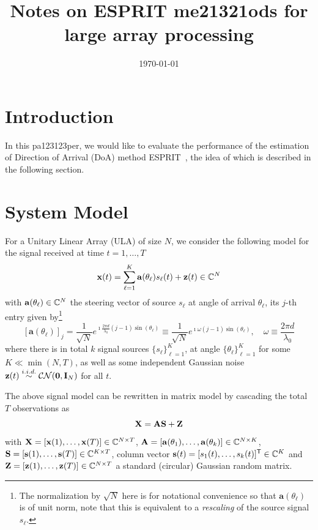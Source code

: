 \documentclass[11pt,a4paper]{article}
\title{Notes on ESPRIT me21321ods for large array processing}
\author{}
\date{\today}
\begin{document}
\maketitle

\section{Introduction}

In this pa123123per, we would like to evaluate the performance of the estimation of Direction of Arrival (DoA) method ESPRIT~\cite{paulraj1986subspace}, the idea of which is described in the following section.

\section{System Model}

For a Unitary Linear Array (ULA) of size $N$, we consider the following model for the signal received at time $t= 1,\ldots, T$
\begin{equation}
	\mathbf{x}(t) = \sum_{\ell = 1}^K \mathbf{a}(\theta_\ell) s_\ell(t) + \mathbf{z}(t) \in {\mathbb{C}}^N
\end{equation}
with $\mathbf{a}(\theta_\ell) \in {\mathbb{C}}^N$ the steering vector of source $s_\ell$ at angle of arrival $\theta_\ell$, its $j$-th entry given by\footnote{The normalization by $\sqrt N$ here is for notational convenience so that $\mathbf{a}(\theta_\ell)$ is of unit norm, note that this is equivalent to a \emph{rescaling} of the source signal $s_\ell$.}
\begin{equation}\label{eq:def_ULA}
	[\mathbf{a}(\theta_\ell)]_j = \frac1{\sqrt N} e^{\imath \frac{2\pi d}{\lambda_0} (j-1) \sin(\theta_\ell)} \equiv \frac1{\sqrt N} e^{\imath \omega (j-1) \sin(\theta_\ell)}, \quad \omega \equiv \frac{2 \pi d }{\lambda_0}
\end{equation}
where there is in total $k$ signal sources $\{s_{\ell}\}_{\ell=1}^K$, at angle $\{\theta_\ell\}_{\ell=1}^K$ for some $K \ll \min(N,T)$, as well as some independent Gaussian noise $\mathbf{z}(t) \overset{i.i.d.}{\sim} \mathcal{CN}(\mathbf{0}, \mathbf{I}_N)$ for all $t$.

The above signal model can be rewritten in matrix model by cascading the total $T$ observations as
\begin{equation}
	{\mathbf{X}} = {\mathbf{A}} {\mathbf{S}} + {\mathbf{Z}}
\end{equation}
with ${\mathbf{X}} = [\mathbf{x}(1), \ldots, \mathbf{x}(T)] \in {\mathbb{C}}^{N \times T}$, ${\mathbf{A}} = [\mathbf{a}(\theta_1), \ldots, \mathbf{a}(\theta_k)] \in {\mathbb{C}}^{N \times K}$, ${\mathbf{S}} = [\mathbf{s}(1), \ldots, \mathbf{s}(T)] \in {\mathbb{C}}^{K \times T}$, column vector $\mathbf{s}(t) = [s_1(t), \ldots, s_k(t)]^{\sf T} \in {\mathbb{C}}^K$ and ${\mathbf{Z}} = [\mathbf{z}(1), \ldots, \mathbf{z}(T)] \in {\mathbb{C}}^{N \times T}$ a standard (circular) Gaussian random matrix.
\end{document}
